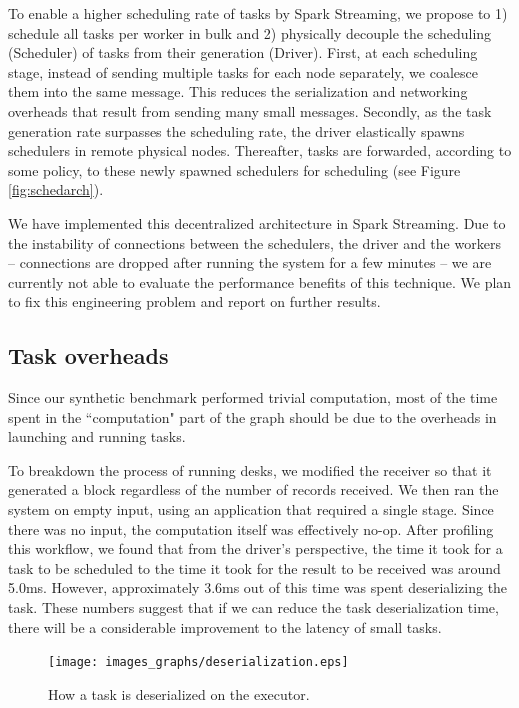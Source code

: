 To enable a higher scheduling rate of tasks by Spark Streaming, we propose to 1) schedule all tasks per worker in bulk and 2) physically decouple the scheduling (Scheduler) of tasks from their generation (Driver).
First, at each scheduling stage, instead of sending multiple tasks for each node separately, we coalesce them into the same message. This reduces the serialization and networking overheads that result from sending many small messages.
Secondly, as the task generation rate surpasses the scheduling rate, the driver elastically spawns schedulers in remote physical nodes. Thereafter, tasks are forwarded, according to some policy, to these newly spawned schedulers for scheduling (see Figure \ref{fig:schedarch}). 

We have implemented this decentralized architecture in Spark Streaming. Due to the instability of connections between the schedulers, the driver and the workers -- connections are dropped after running the system for a few minutes -- we are currently not able to evaluate the performance benefits of this technique. We plan to fix this engineering problem and report on further results.

\subsection{Task overheads}

Since our synthetic benchmark performed trivial computation, most of the time spent in the ``computation" part of the graph should be due to the overheads in launching and running tasks. 

To breakdown the process of running desks, we modified the receiver so that it generated a block regardless of the number of records received. We then ran the system on empty input, using an application that required a single stage. Since there was no input, the computation itself was effectively no-op. After profiling this workflow, we found that from the driver's perspective, the time it took for a task to be scheduled to the time it took for the result to be received was around 5.0ms. However, approximately 3.6ms out of this time was spent deserializing the task. These numbers suggest that if we can reduce the task deserialization time, there will be a considerable improvement to the latency of small tasks.

\begin{figure}[t!]
 \begin{center}
   \texttt{[image: images\_graphs/deserialization.eps]}
 \end{center}
 \caption{How a task is deserialized on the executor. }
 \label{fig:deserialization}
\end{figure}

